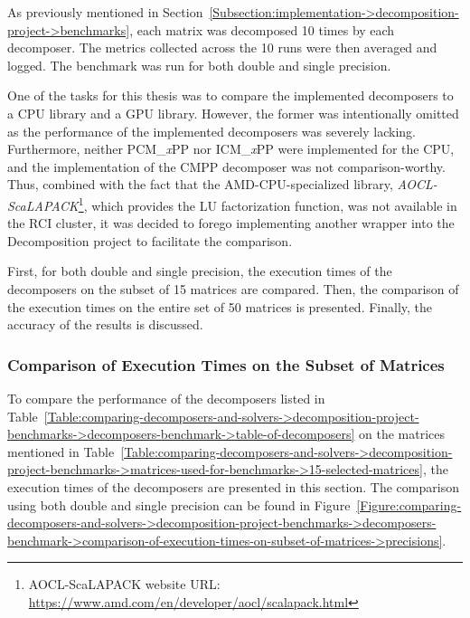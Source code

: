 As previously mentioned in Section~\ref{Subsection:implementation->decomposition-project->benchmarks}, each matrix was decomposed 10 times by each decomposer.
The metrics collected across the 10 runs were then averaged and logged.
The benchmark was run for both double and single precision.

One of the tasks for this thesis was to compare the implemented decomposers to a CPU library and a GPU library.
However, the former was intentionally omitted as the performance of the implemented decomposers was severely lacking.
Furthermore, neither PCM\_\textit{x}PP nor ICM\_\textit{x}PP were implemented for the CPU, and the implementation of the CMPP decomposer was not comparison-worthy.
Thus, combined with the fact that the AMD-CPU-specialized library, \textit{AOCL-ScaLAPACK}\footnote{AOCL-ScaLAPACK website URL: \url{https://www.amd.com/en/developer/aocl/scalapack.html}}, which provides the LU factorization function, was not available in the RCI cluster, it was decided to forego implementing another wrapper into the Decomposition project to facilitate the comparison.

First, for both double and single precision, the execution times of the decomposers on the subset of 15 matrices are compared.
Then, the comparison of the execution times on the entire set of 50 matrices is presented.
Finally, the accuracy of the results is discussed.


\subsubsection{Comparison of Execution Times on the Subset of Matrices}\label{Subsection:comparing-decomposers-and-solvers->decomposition-project-benchmarks->decomposers-benchmark->comparison-of-execution-times-on-subset-of-matrices}
To compare the performance of the decomposers listed in Table~\ref{Table:comparing-decomposers-and-solvers->decomposition-project-benchmarks->decomposers-benchmark->table-of-decomposers} on the matrices mentioned in Table~\ref{Table:comparing-decomposers-and-solvers->decomposition-project-benchmarks->matrices-used-for-benchmarks->15-selected-matrices}, the execution times of the decomposers are presented in this section.
The comparison using both double and single precision can be found in Figure~\ref{Figure:comparing-decomposers-and-solvers->decomposition-project-benchmarks->decomposers-benchmark->comparison-of-execution-times-on-subset-of-matrices->precisions}.

